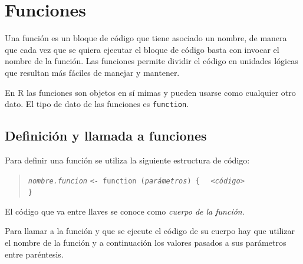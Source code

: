 \documentclass[
  a4paper,
]{scrreport}
\theoremstyle{definition}
\theoremstyle{definition}
\theoremstyle{remark}
\begin{document}

\hypertarget{funciones}{%
\chapter{Funciones}\label{funciones}}

Una función es un bloque de código que tiene asociado un nombre, de
manera que cada vez que se quiera ejecutar el bloque de código basta con
invocar el nombre de la función. Las funciones permite dividir el código
en unidades lógicas que resultan más fáciles de manejar y mantener.

En R las funciones son objetos en sí mimas y pueden usarse como
cualquier otro dato. El tipo de dato de las funciones es
\texttt{function}.

\hypertarget{definiciuxf3n-y-llamada-a-funciones}{%
\section{Definición y llamada a
funciones}\label{definiciuxf3n-y-llamada-a-funciones}}

Para definir una función se utiliza la siguiente estructura de código:

\begin{quote}
\emph{\texttt{nombre.funcion}}
\texttt{\textless{}-\ function\ (}\emph{\texttt{parámetros}}\texttt{)\ \{}
  \emph{\texttt{\textless{}código\textgreater{}}}\\
\texttt{\}}
\end{quote}

El código que va entre llaves se conoce como \emph{cuerpo de la
función}.

Para llamar a la función y que se ejecute el código de su cuerpo hay que
utilizar el nombre de la función y a continuación los valores pasados a
sus parámetros entre paréntesis.
\end{document}
